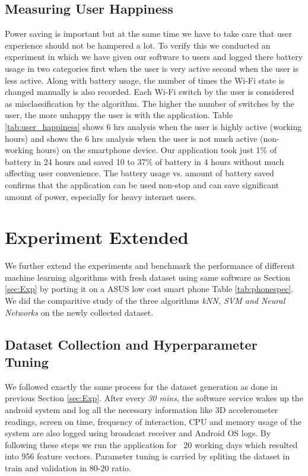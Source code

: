 \subsection{Measuring User Happiness}
\label{userhapiness}
Power saving is important but at the same time
we have to take care that user experience should not be hampered a lot. To verify this
we conducted an experiment in which we have given our software to users and logged there
battery usage in two categories first when the user is very active second when the user
is less active. Along with battery usage, the number of times the Wi-Fi state is changed manually is also recorded. Each Wi-Fi switch by the user is considered as misclassification by the algorithm. The higher the number of switches by the user, the more unhappy the user is with the application.
Table \ref{tab:user_happiness} shows 6 hrs analysis when the user is highly active (working hours) and shows the 6 hrs analysis when the user is not much active (non-working hours) on the smartphone device.
Our application took just 1\% of battery in 24 hours and saved 10 to 37\% of battery in 4 hours without much affecting
user convenience. The battery usage vs. amount of battery saved confirms that the application can be used non-stop and can save significant amount of power, especially for heavy internet users.



\section{Experiment Extended}
We further extend the experiments and benchmark the performance of different machine learning algorithms with fresh dataset using same software as Section \ref{sec:Exp} by porting it on a ASUS low cost smart phone Table \ref{tab:phonespec}. We did the comparitive study of the three algorithms \textit{kNN, SVM and Neural Networks} on the newly collected dataset. 

\subsection{Dataset Collection and Hyperparameter Tuning}
We followed exactly the same process for the dataset generation as done in previous Section \ref{sec:Exp}. After
every \textit{30 mins}, the software service wakes up the android system and log all the necessary information like 3D accelerometer readings, screen on time, frequency of interaction, CPU and memory usage of the system are also logged using broadcast receiver and Android OS logs. By following these steps we run the application for ~20 working days which resulted into 956 feature vectors. Parameter tuning is carried by spliting the dataset in train and validation in 80-20 ratio.
